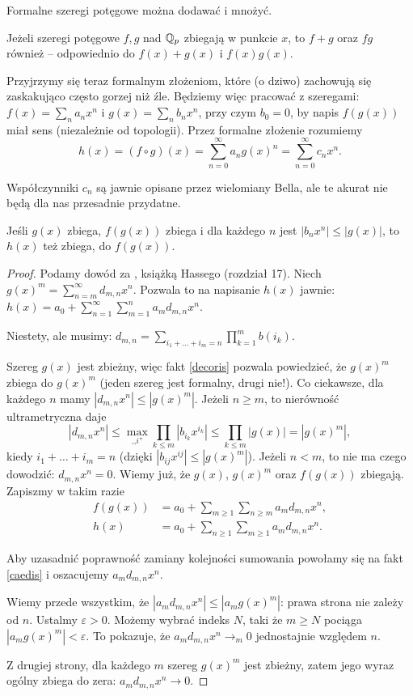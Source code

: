 Formalne szeregi potęgowe można dodawać i mnożyć.

\begin{fakt}\label{decoris}
	Jeżeli szeregi potęgowe $f, g$ nad $\mathbb Q_p$ zbiegają w punkcie $x$, to $f+g$ oraz $fg$ również -- odpowiednio do $f(x) + g(x)$ i $f(x)g(x)$.
\end{fakt}

Przyjrzymy się teraz formalnym złożeniom, które (o dziwo) zachowują się zaskakująco często gorzej niż źle.
Będziemy więc pracować z szeregami: $f(x) = \sum_n a_n x^n$ i $g(x) = \sum_n b_n x^n$, przy czym $b_0 = 0$, by napis $f(g(x))$ miał sens (niezależnie od topologii).
Przez formalne złożenie rozumiemy
\[
	h(x) = (f \circ g)(x) = \sum_{n = 0}^\infty a_n g(x)^n = \sum_{n = 0}^\infty c_n x^n.
\]

Współczynniki $c_n$ są jawnie opisane przez wielomiany Bella, ale te akurat nie będą dla nas przesadnie przydatne.

\begin{fakt}[złoty] \label{auctoris}
	Jeśli $g(x)$ zbiega, $f(g(x))$ zbiega i dla każdego $n$ jest $|b_n x^n| \le |g(x)|$, to $h(x)$ też zbiega, do $f(g(x))$.
\end{fakt}

\begin{proof}
	Podamy dowód za \cite{hasse80}, książką Hassego (rozdział 17).
	Niech $g(x)^m = \sum_{n = m}^\infty d_{m, n} x^n$.
	Pozwala to na napisanie $h(x)$ jawnie: $h(x) = a_0 + \sum_{n = 1}^\infty \sum_{m = 1}^n a_m d_{m, n} x^n$.

	Niestety, ale musimy: $d_{m, n} = \sum_{i_1 + \ldots + i_m = n} \prod_{k = 1}^m b(i_k)$.

	Szereg $g(x)$ jest zbieżny, więc fakt  \ref{decoris} pozwala powiedzieć, że $g(x)^m$ zbiega do $g(x)^m$ (jeden szereg jest formalny, drugi nie!).
	Co ciekawsze, dla każdego $n$ mamy $|d_{m,n}x^n| \le |g(x)^m|$.
	Jeżeli $n \ge m$, to nierówność ultrametryczna daje
	\[
		|d_{m,n}x^n| \le \max_{\mbox{,,}i\mbox{''}} \prod_{k \le m} |b_{i_k} x^{i_k}| \le \prod_{k \le m} |g(x)| = |g(x)^m|,
	\]
	kiedy $i_1 + \ldots + i_m = n$ (dzięki $|b_{ij} x^{ij}| \le |g(x)^m|$).
	Jeżeli $n < m$, to nie ma czego dowodzić: $d_{m,n}x^n = 0$.
	Wiemy już, że $g(x)$, $g(x)^m$ oraz $f(g(x))$ zbiegają.
	Zapiszmy w takim razie
	\begin{align*}
	 	f(g(x))	& = a_0 + \sum_{m \ge 1} \sum_{n \ge m} a_m d_{m,n}x^n,\\
		h(x) & = a_0 + \sum_{n \ge 1} \sum_{m \ge 1} a_md_{m,n} x^n.
	\end{align*}

	Aby uzasadnić poprawność zamiany kolejności sumowania powołamy się na fakt \ref{caedis} i oszacujemy $a_md_{m,n}x^n$.

	Wiemy przede wszystkim, że $|a_md_{m,n}x^n| \le |a_mg(x)^m|$: prawa strona nie zależy od $n$.
	Ustalmy $\varepsilon > 0$.
	Możemy wybrać indeks $N$, taki że $m \ge N$ pociąga $|a_mg(x)^m| < \varepsilon$.
	To pokazuje, że $a_md_{m,n}x^n \to_m 0$ jednostajnie względem $n$.

	Z drugiej strony, dla każdego $m$ szereg $g(x)^m$ jest zbieżny, zatem jego wyraz ogólny zbiega do zera: $a_m d_{m,n}x^n \to 0$.
\end{proof}


